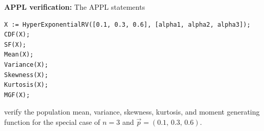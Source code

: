 \documentclass[12pt,fullpage]{article}
\begin{document}
\vspace{0.1in}

\noindent
{\bf APPL verification:}
The APPL statements
\begin{verbatim}
X := HyperExponentialRV([0.1, 0.3, 0.6], [alpha1, alpha2, alpha3]);
CDF(X);
SF(X);
Mean(X);
Variance(X);
Skewness(X);
Kurtosis(X);
MGF(X);
\end{verbatim}
verify the population mean, variance, skewness, kurtosis, and moment generating function
for the special case of $n=3$ and $\vec p = (0.1,\, 0.3,\, 0.6)$.
\end{document}
